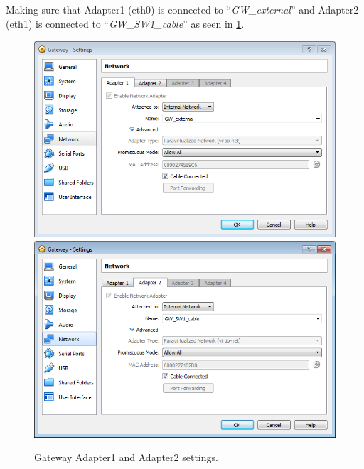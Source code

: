 \documentclass[12pt,a4paper,final]{IEEtran}
\begin{document}
\subsection{}
Making sure that Adapter1 (eth0) is connected to ``\textit{GW\_external}'' and Adapter2 (eth1) is connected to ``\textit{GW\_SW1\_cable}'' as seen in \ref{tab:2c_Gateway_settings}.

\begin{figure}[!h]
\includegraphics[width=1.0\textwidth]{2c_1.png}
\includegraphics[width=1.0\textwidth]{2c_2.png}
\caption{Gateway Adapter1 and Adapter2 settings.}
\label{tab:2c_Gateway_settings} 
\end{figure} 
\end{document}
